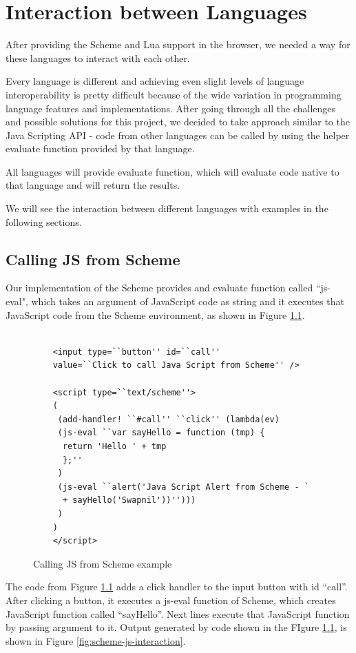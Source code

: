 \chapter{Interaction between Languages} \label{interaction}

After providing the Scheme and Lua support in the browser, we needed a way for these languages to interact with each other. 

Every language is different and achieving even slight levels of language interoperability is pretty difficult because of the wide variation in programming language features and implementations. After going through all the challenges and possible solutions for this project, we decided to take approach similar to the Java Scripting API \cite{Juneau2017} - code from other languages can be called by using the helper evaluate function provided by that language.

All languages will provide evaluate function, which will evaluate code native to that language and will return the results.

We will see the interaction between different languages with examples in the following sections.

\section{Calling JS from Scheme}

Our implementation of the Scheme provides and evaluate function called ``js-eval", which takes an argument of JavaScript code as string and it executes that JavaScript code from the Scheme environment, as shown in Figure \ref{fig:jsfromscheme}.

\begin{figure}[H]
	\begin{lstlisting}
	
	<input type=``button'' id=``call'' 
	value=``Click to call Java Script from Scheme'' />
	
	<script type=``text/scheme''>
	(
	 (add-handler! ``#call'' ``click'' (lambda(ev)
	 (js-eval ``var sayHello = function (tmp) {
	  return 'Hello ' + tmp
	  };''
	 )
	 (js-eval ``alert('Java Script Alert from Scheme - ` 
	  + sayHello('Swapnil'))'')))
	 )
	)
	</script>
	\end{lstlisting}
	\caption{Calling JS from Scheme example}
	\label{fig:jsfromscheme}
\end{figure}

The code from Figure \ref{fig:jsfromscheme} adds a click handler to the input button with id ``call''. After clicking a button, it executes a js-eval function of Scheme, which creates JavaScript function called ``sayHello''.  Next lines execute that JavaScript function by passing argument to it.  Output generated by code shown in the FIgure \ref{fig:jsfromscheme}, is shown in Figure \ref{fig:scheme-js-interaction}.


